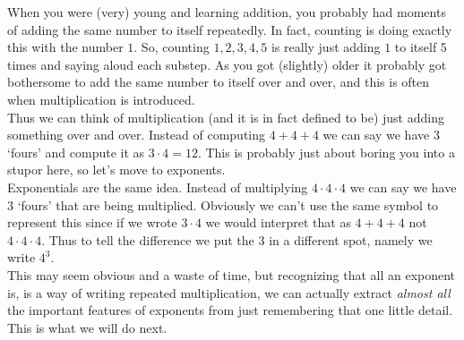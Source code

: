\documentclass{ximera}
\begin{document}
        When you were (very) young and learning addition, you probably had moments of adding the same number to itself repeatedly. In fact, counting is doing exactly this with the number $1$. So, counting $1,2,3,4,5$ is really just adding $1$ to itself 5 times and saying aloud each substep. As you got (slightly) older it probably got bothersome to add the same number to itself over and over, and this is often when multiplication is introduced.\\
        Thus we can think of multiplication (and it is in fact defined to be) just adding something over and over. Instead of computing $4 + 4 + 4$ we can say we have $3$ `fours' and compute it as $3 \cdot 4 = 12$. This is probably just about boring you into a stupor here, so let's move to exponents.\\
        Exponentials are the same idea. Instead of multiplying $4 \cdot 4 \cdot 4$ we can say we have $3$ `fours' that are being multiplied. Obviously we can't use the same symbol to represent this since if we wrote $3 \cdot 4$ we would interpret that as $4 + 4 + 4$ not $4 \cdot 4 \cdot 4$. Thus to tell the difference we put the $3$ in a different spot, namely we write $4^3$.\\
        This may seem obvious and a waste of time, but recognizing that all an exponent is, is a way of writing repeated multiplication, we can actually extract \textit{almost all} the important features of exponents from just remembering that one little detail. This is what we will do next.

\end{document}
